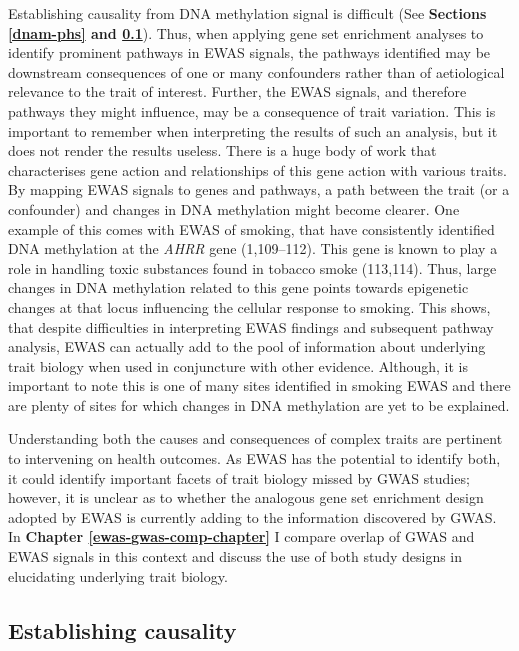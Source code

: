 \documentclass[11pt,oneside]{bristolthesis}
\begin{document}
Establishing causality from DNA methylation signal is difficult (See \textbf{Sections \ref{dnam-phs} and \ref{establishing-causality}}). Thus, when applying gene set enrichment analyses to identify prominent pathways in EWAS signals, the pathways identified may be downstream consequences of one or many confounders rather than of aetiological relevance to the trait of interest. Further, the EWAS signals, and therefore pathways they might influence, may be a consequence of trait variation. This is important to remember when interpreting the results of such an analysis, but it does not render the results useless. There is a huge body of work that characterises gene action and relationships of this gene action with various traits. By mapping EWAS signals to genes and pathways, a path between the trait (or a confounder) and changes in DNA methylation might become clearer. One example of this comes with EWAS of smoking, that have consistently identified DNA methylation at the \emph{AHRR} gene (1,109--112). This gene is known to play a role in handling toxic substances found in tobacco smoke (113,114). Thus, large changes in DNA methylation related to this gene points towards epigenetic changes at that locus influencing the cellular response to smoking. This shows, that despite difficulties in interpreting EWAS findings and subsequent pathway analysis, EWAS can actually add to the pool of information about underlying trait biology when used in conjuncture with other evidence. Although, it is important to note this is one of many sites identified in smoking EWAS and there are plenty of sites for which changes in DNA methylation are yet to be explained.

Understanding both the causes and consequences of complex traits are pertinent to intervening on health outcomes. As EWAS has the potential to identify both, it could identify important facets of trait biology missed by GWAS studies; however, it is unclear as to whether the analogous gene set enrichment design adopted by EWAS is currently adding to the information discovered by GWAS. In \textbf{Chapter \ref{ewas-gwas-comp-chapter}} I compare overlap of GWAS and EWAS signals in this context and discuss the use of both study designs in elucidating underlying trait biology.

\hypertarget{establishing-causality}{%
\subsection{Establishing causality}\label{establishing-causality}}
\end{document}
